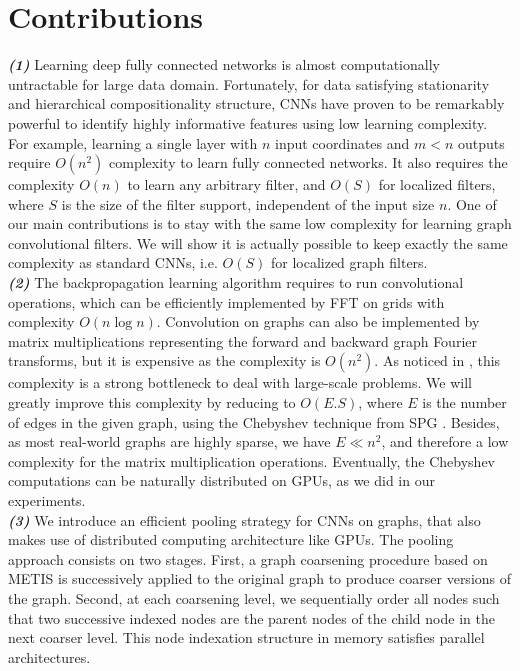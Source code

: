 \documentclass{article}
\begin{document}
\section{Contributions}
\vspace{-0.2cm}
{\textbf {\textit {(1)}}} Learning deep fully connected networks is almost computationally untractable for large data domain. Fortunately, for data satisfying stationarity and hierarchical compositionality structure, CNNs have proven to be remarkably powerful to identify highly informative features using low learning complexity. For example, learning a single layer with $n$ input coordinates and $m<n$ outputs require $O(n^2)$ complexity to learn fully connected networks. It also requires the complexity $O(n)$ to learn any arbitrary filter, and $O(S)$ for localized filters, where $S$ is the size of the filter support, independent of the input size $n$. One of our main contributions is to stay with the same low complexity for learning graph convolutional filters. We will show it is actually possible to keep exactly the same complexity as standard CNNs, i.e. $O(S)$ for localized graph filters.\\
{\textbf {\textit {(2)}}} The backpropagation learning algorithm requires to run convolutional operations, which can be efficiently implemented by FFT on grids with complexity $O(n\log n)$. Convolution on graphs can also be implemented by matrix multiplications representing the forward and backward graph Fourier transforms, but it is expensive as the complexity is $O(n^2)$. As noticed in \cite{art:HenaffBrunaLeCun15DLgraphs}, this complexity is a strong bottleneck to deal with large-scale problems. We will greatly improve this complexity by reducing to $O(E.S)$, where $E$ is the number of edges in the given graph, using the Chebyshev technique from SPG \cite{art:ShumanNarangFrossardOrtegaVandergheynst13ReviewSPG}. Besides, as most real-world graphs are highly sparse, we have $E\ll n^2$, and therefore a low complexity for the matrix multiplication operations. Eventually, the Chebyshev computations can be naturally distributed on GPUs, as we did in our experiments.\\
{\textbf {\textit {(3)}}} We introduce an efficient pooling strategy for CNNs on graphs, that also makes use of distributed computing architecture like GPUs. The pooling approach consists on two stages. First, a graph coarsening procedure based on METIS \cite{art:DhillonGuanKulis07Graclus,art:KarypisKumar98Metis} is successively applied to the original graph to produce coarser versions of the graph. Second, at each coarsening level, we sequentially order all nodes such that two successive indexed nodes are the parent nodes of the child node in the next coarser level. This node indexation structure in memory satisfies parallel architectures. \\
\end{document}
